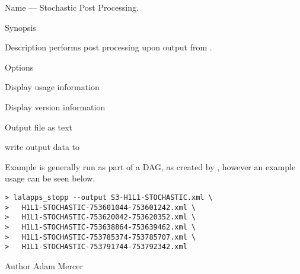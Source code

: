 \begin{entry}
\item[Name]
 --- Stochastic Post Processing.

\item[Synopsis]
  \newline \hspace*{0.5in}
 \newline \hspace*{0.5in}
 \newline \hspace*{0.5in}
 \newline \hspace*{0.5in}
 

\item[Description]
 performs post processing upon output from
.

\item[Options]\leavevmode
\begin{entry}
\item[\option{--help}]
Display usage information
\item[\option{--version}]
Display version information
\item[\option{--text}]
Output file as text
\item[\option{--output} \parm{FILE}]
write output data to 
\end{entry}

\item[Example]
 is generally run as part of a DAG, as created by
, however an example usage can be seen
below.

\begin{verbatim}
> lalapps_stopp --output S3-H1L1-STOCHASTIC.xml \
>   H1L1-STOCHASTIC-753601044-753601242.xml \
>   H1L1-STOCHASTIC-753620042-753620352.xml \
>   H1L1-STOCHASTIC-753638864-753639462.xml \
>   H1L1-STOCHASTIC-753785374-753785707.xml \
>   H1L1-STOCHASTIC-753791744-753792342.xml
\end{verbatim}

\item[Author]
Adam Mercer
\end{entry}
